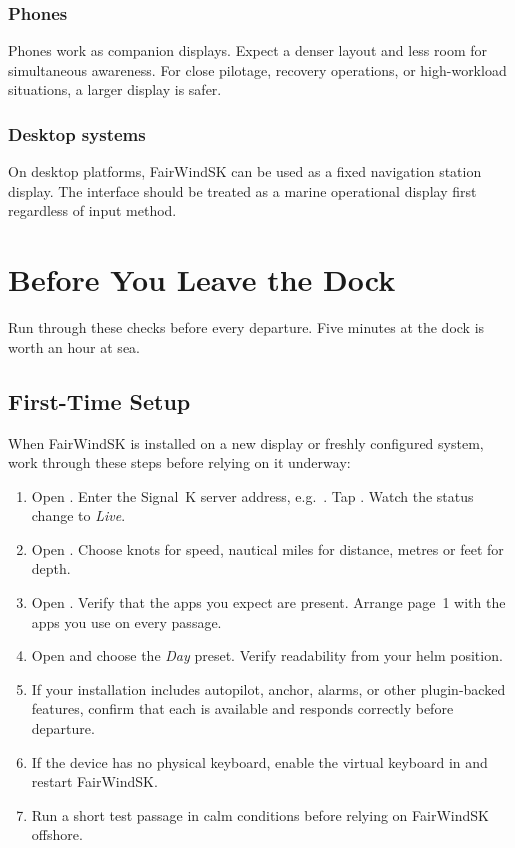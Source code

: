 \subsection{Phones}

Phones work as companion displays.
Expect a denser layout and less room for simultaneous awareness.
For close pilotage, recovery operations, or high-workload situations, a larger
display is safer.

\subsection{Desktop systems}

On desktop platforms, FairWindSK can be used as a fixed navigation station
display.
The interface should be treated as a marine operational display first regardless
of input method.

\chapter{Before You Leave the Dock}

Run through these checks before every departure.
Five minutes at the dock is worth an hour at sea.

\section{First-Time Setup}

When FairWindSK is installed on a new display or freshly configured system, work
through these steps before relying on it underway:

\begin{enumerate}
  \item Open .
        Enter the Signal~K server address, e.g.\ .
        Tap .
        Watch the status change to \textit{Live}.
  \item Open .
        Choose knots for speed, nautical miles for distance, metres or feet for depth.
  \item Open .
        Verify that the apps you expect are present.
        Arrange page~1 with the apps you use on every passage.
  \item Open  and choose the \textit{Day} preset.
        Verify readability from your helm position.
  \item If your installation includes autopilot, anchor, alarms, or other
        plugin-backed features, confirm that each is available and responds correctly
        before departure.
  \item If the device has no physical keyboard, enable the virtual keyboard in
         and restart FairWindSK.
  \item Run a short test passage in calm conditions before relying on FairWindSK
        offshore.
\end{enumerate}

